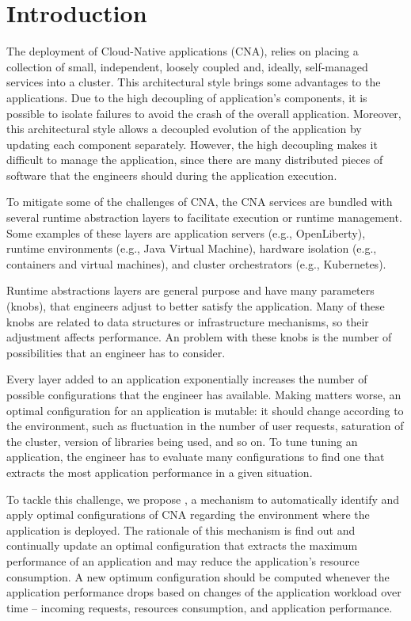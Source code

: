 \section{Introduction}

The deployment of Cloud-Native applications (CNA), relies on placing a
collection of small, independent, loosely coupled and, ideally, self-managed
services into a cluster. This architectural style brings some advantages to the
applications. Due to the high decoupling of application's components, it is
possible to isolate failures to avoid the crash of the overall application.
Moreover, this architectural style allows a decoupled evolution of the
application by updating each component separately. However, the high decoupling
makes it difficult to manage the application, since there are many
distributed pieces of software that the engineers should  during the
application execution.

To mitigate some of the challenges of CNA, the CNA services are bundled with
several runtime abstraction layers to facilitate execution or runtime
management. Some examples of these layers are application servers (e.g.,
OpenLiberty), runtime environments (e.g., Java Virtual Machine), hardware
isolation (e.g., containers and virtual machines), and cluster orchestrators
(e.g., Kubernetes).

Runtime abstractions layers are general purpose and have many parameters
(knobs), that engineers adjust to better satisfy the application. Many of these
knobs are related to data structures or infrastructure mechanisms, so their
adjustment affects performance. An problem with these knobs is the number of
possibilities that an engineer has to consider.

Every layer added to an application exponentially increases the number of
possible configurations that the engineer has available.  Making matters worse,
an optimal configuration for an application is mutable: it should change
according to the environment, such as fluctuation in the number of user requests,
saturation of the cluster, version of libraries being used, and so on.  To tune
tuning an application, the engineer has to evaluate many configurations to find
one that extracts the most application performance in a given situation.

To tackle this challenge, we propose \name, a mechanism to automatically
identify and apply optimal configurations of CNA regarding the environment where
the application is deployed. The rationale of this mechanism is find out and
continually update an optimal configuration that extracts the maximum
performance of an application and may reduce the application's resource
consumption. A new optimum configuration should be computed whenever the
application performance drops based on changes of the application workload over
time -- incoming requests, resources consumption, and application performance.




